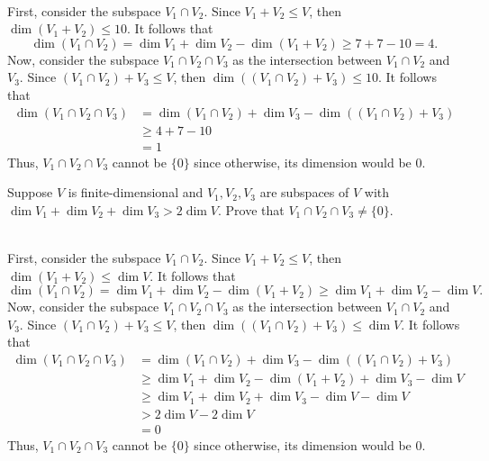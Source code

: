 \begin{solution}
    \\ First, consider the subspace $V_1 \cap V_2$. Since $V_1 + V_2 \leq V$, then $\dim (V_1 + V_2) \leq 10$. It follows that
    $$\dim(V_1 \cap V_2) = \dim V_1 + \dim V_2 - \dim (V_1 + V_2) \geq 7 + 7 - 10 = 4.$$
    Now, consider the subspace $V_1 \cap V_2 \cap V_3$ as the intersection between $V_1 \cap V_2$ and $V_3$. Since $(V_1 \cap V_2) + V_3 \leq V$, then $\dim((V_1 \cap V_2) + V_3) \leq 10$. It follows that
    \begin{align*}
        \dim (V_1 \cap V_2 \cap V_3) &= \dim(V_1 \cap V_2) + \dim V_3 - \dim ((V_1 \cap V_2) + V_3) \\
        &\geq 4 + 7 - 10 \\
        &= 1
    \end{align*}
    Thus, $V_1 \cap V_2 \cap V_3$ cannot be $\{0\}$ since otherwise, its dimension would be 0. \\
\end{solution}

\begin{exercise}
    Suppose $V$ is finite-dimensional and $V_1, V_2, V_3$ are subspaces of $V$ with $\dim V_1 + \dim V_2 + \dim V_3 > 2\dim V$. Prove that $V_1 \cap V_2 \cap V_3 \neq \{0\}$. \\
\end{exercise}

\begin{solution}
    \\ First, consider the subspace $V_1 \cap V_2$. Since $V_1 + V_2 \leq V$, then $\dim (V_1 + V_2) \leq \dim V$. It follows that
    $$\dim(V_1 \cap V_2) = \dim V_1 + \dim V_2 - \dim (V_1 + V_2) \geq \dim V_1 + \dim V_2 - \dim V.$$
    Now, consider the subspace $V_1 \cap V_2 \cap V_3$ as the intersection between $V_1 \cap V_2$ and $V_3$. Since $(V_1 \cap V_2) + V_3 \leq V$, then $\dim((V_1 \cap V_2) + V_3) \leq \dim V$. It follows that
    \begin{align*}
        \dim (V_1 \cap V_2 \cap V_3) &= \dim(V_1 \cap V_2) + \dim V_3 - \dim ((V_1 \cap V_2) + V_3) \\
        &\geq \dim V_1 + \dim V_2 - \dim(V_1 + V_2) + \dim V_3 - \dim V \\
        &\geq \dim V_1 + \dim V_2 + \dim V_3 - \dim V - \dim V \\
        &> 2\dim V - 2 \dim V \\
        &= 0
    \end{align*}
    Thus, $V_1 \cap V_2 \cap V_3$ cannot be $\{0\}$ since otherwise, its dimension would be 0. \\
\end{solution}


